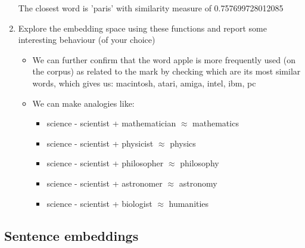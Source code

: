 \documentclass{article} %
\begin{document}
\begin{enumerate}
    The closest word is 'paris' with similarity measure of 0.757699728012085

    \item
    Explore the embedding space using these functions and report some interesting
    behaviour (of your choice)

    \begin{itemize}
        \item
        We can further confirm that the word apple is more frequently used (on the
        corpus) as related to the mark by checking which are its most similar words,
        which gives us: macintosh, atari, amiga, intel, ibm, pc
        \item
        We can make analogies like:
        \begin{itemize}
            \item science - scientist + mathematician $\approx$ mathematics
            \item science - scientist + physicist $\approx$ physics
            \item science - scientist + philosopher $\approx$ philosophy
            \item science - scientist + astronomer $\approx$ astronomy
            \item science - scientist + biologist $\approx$ humanities
        \end{itemize}
    \end{itemize}

\end{enumerate}

\subsection{Sentence embeddings}
\end{document}
